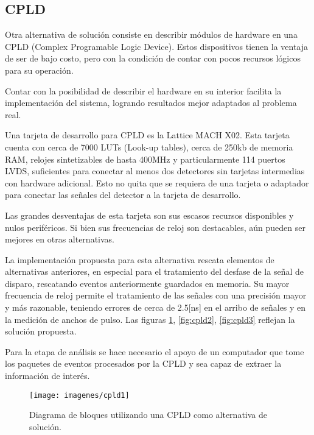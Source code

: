 \newpage
\subsection{CPLD}
\par Otra alternativa de solución consiste en describir módulos de hardware en una CPLD (Complex Programable Logic Device). Estos dispositivos tienen la ventaja de ser de bajo costo, pero con la condición de contar con pocos recursos lógicos para su operación.
\par Contar con la posibilidad de describir el hardware en su interior facilita la implementación del sistema, logrando resultados mejor adaptados al problema real.
\par Una tarjeta de desarrollo para CPLD es la Lattice MACH X02\cite{Semiconductor2017DS1035Sheet}. Esta tarjeta cuenta con cerca de 7000 LUTs (Look-up tables), cerca de 250kb de memoria RAM, relojes sintetizables de hasta 400MHz y particularmente 114 puertos LVDS, suficientes para conectar al menos dos detectores sin tarjetas intermedias con hardware adicional. Esto no quita que se requiera de una tarjeta o adaptador para conectar las señales del detector a la tarjeta de desarrollo.

\par Las grandes desventajas de esta tarjeta son sus escasos recursos disponibles y nulos periféricos. Si bien sus frecuencias de reloj son destacables, aún pueden ser mejores en otras alternativas.

\par La implementación propuesta para esta alternativa rescata elementos de alternativas anteriores, en especial para el tratamiento del desfase de la señal de disparo, rescatando eventos anteriormente guardados en memoria. Su mayor frecuencia de reloj permite el tratamiento de las señales con una precisión mayor y más razonable, teniendo errores de cerca de 2.5[ns] en el arribo de señales y en la medición de anchos de pulso. Las figuras \ref{fig:cpld1}, \ref{fig:cpld2}, \ref{fig:cpld3} reflejan la solución propuesta.

\par Para la etapa de análisis se hace necesario el apoyo de un computador que tome los paquetes de eventos procesados por la CPLD y sea capaz de extraer la información de interés.

\begin{figure}[H]
    \centering
    \texttt{[image: imagenes/cpld1]}
    \caption{Diagrama de bloques utilizando una CPLD como alternativa de solución.}
    \label{fig:cpld1}
\end{figure}



